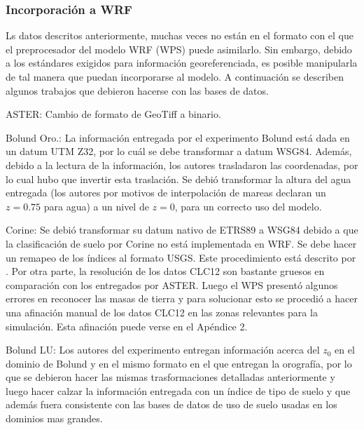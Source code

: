 \subsubsection{Incorporación a WRF}
Ls datos descritos anteriormente, muchas veces no están en el formato con el que el preprocesador del modelo WRF (WPS) puede asimilarlo. Sin embargo, debido a los estándares exigidos para información georeferenciada, es posible manipularla de tal manera que puedan incorporarse al modelo. A continuación se describen algunos trabajos que debieron hacerse con las bases de datos.
\begin{itemize*}
	\item ASTER: Cambio de formato de GeoTiff a binario.
	\item Bolund Oro.: La información entregada por el experimento Bolund está dada en un datum UTM Z32, por lo cuál se debe transformar a datum WSG84. Además, debido a la lectura de la información, los autores trasladaron las coordenadas, por lo cual hubo que invertir esta traslación. Se debió transformar la altura del agua entregada (los autores por motivos de interpolación de mareas declaran un $z=0.75$ para agua) a un nivel de $z=0$, para un correcto uso del modelo. 
	\item Corine: Se debió transformar su datum nativo de ETRS89 a WSG84 debido a que la clasificación de suelo por Corine no está implementada en WRF. Se debe hacer un remapeo de los índices al formato USGS. Este procedimiento está descrito por \cite{Pineda2004}. Por otra parte, la resolución de los datos CLC12 son bastante gruesos en comparación con los entregados por ASTER. Luego el WPS presentó algunos errores en reconocer las masas de tierra y para solucionar esto se procedió a hacer una afinación manual de los datos CLC12 en las zonas relevantes para la simulación. Esta afinación puede verse en el Apéndice 2.
	\item Bolund LU: Los autores del experimento entregan información acerca del $z_0$ en el dominio de Bolund y en el mismo formato en el que entregan la orografía, por lo que se debieron hacer las mismas trasformaciones detalladas anteriormente y luego hacer calzar la información entregada con un índice de tipo de suelo y que además fuera consistente con las bases de datos de uso de suelo usadas en los dominios mas grandes.
\end{itemize*}
